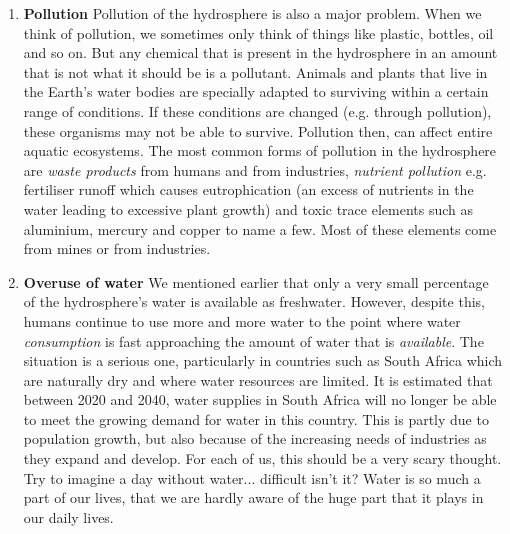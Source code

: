       \label{m38138*id342223}\begin{enumerate}[noitemsep, label=\textbf{\arabic*}. ] 
            \label{m38138*uid91}\item \textbf{Pollution}\newline
Pollution of the hydrosphere is also a major problem. When we think of pollution, we sometimes only think of things like plastic, bottles, oil and so on. But any chemical that is present in the hydrosphere in an amount that is not what it should be is a pollutant. Animals and plants that live in the Earth's water bodies are specially adapted to surviving within a certain range of conditions. If these conditions are changed (e.g. through pollution), these organisms may not be able to survive. Pollution then, can affect entire aquatic ecosystems. The most common forms of pollution in the hydrosphere are \textsl{waste products} from humans and from industries, \textsl{nutrient pollution} e.g. fertiliser runoff which causes eutrophication (an excess of nutrients in the water leading to excessive plant growth) and toxic trace elements such as aluminium, mercury and copper to name a few. Most of these elements come from mines or from industries.
\label{m38138*uid87}\item \textbf{Overuse of water}\newline
We mentioned earlier that only a very small percentage of the hydrosphere's water is available as freshwater. However, despite this, humans continue to use more and more water to the point where water \textsl{consumption} is fast approaching the amount of water that is \textsl{available}. The situation is a serious one, particularly in countries such as South Africa which are naturally dry and where water resources are limited. It is estimated that between 2020 and 2040, water supplies in South Africa will no longer be able to meet the growing demand for water in this country. This is partly due to population growth, but also because of the increasing needs of industries as they expand and develop. For each of us, this should be a very scary thought. Try to imagine a day without water... difficult isn't it? Water is so much a part of our lives, that we are hardly aware of the huge part that it plays in our daily lives.
\end{enumerate}
\label{m38138*secfhsst!!!underscore!!!id1046}
